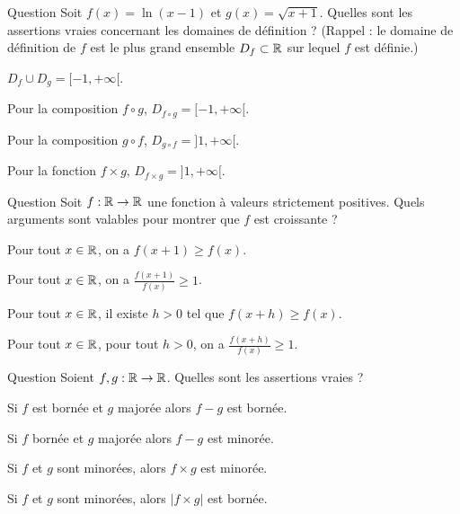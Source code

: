 \begin{multi}[multiple,feedback=
{\(D_f = ]1,+\infty[\) ; \(D_g = [-1,+\infty[\) ; 
\(D_f \cup D_g = [-1,+\infty[\) ;
\(D_{f \times g} = D_f \cap D_g = ]1,+\infty[\) ;
\(D_{f \circ g} = ]1,+\infty[\).
\(g \circ f\) n'est pas définie pour \(x\) proche de \(1\), en fait 
\(D_{g\circ f} = [1+\frac1e,+\infty[\).
}]{Question}
Soit \(f(x) = \ln(x-1)\) et \(g(x) = \sqrt{x+1}\). 
Quelles sont les assertions vraies concernant les domaines de définition ? (Rappel : le domaine de définition de \(f\) est le plus grand ensemble \(D_f \subset \mathbb{R}\) sur lequel \(f\) est définie.)

    \item* \(D_f \cup D_g = [-1,+\infty[\).
    \item Pour la composition \(f \circ g\), \(D_{f\circ g} = [-1,+\infty[\).
    \item Pour la composition \(g \circ f\), \(D_{g\circ f} = ]1,+\infty[\).
    \item* Pour la fonction \(f \times g\), \(D_{f\times g} = ]1,+\infty[\).
\end{multi}


\begin{multi}[multiple,feedback=
{En notant \(y = x+h\) avec \(h>0\) on a \(y > x\) et donc il suffit d'avoir \(\frac{f(y)}{f(x)} \ge 1\).
Par contre, il n'est pas suffisant de comparer \(f\) en des valeurs distantes de \(1\) ! Essayez de dessiner un contre-exemple : \(f\) vaut \(0\) partout, sauf \(1\) en chaque entier.
}]{Question}
Soit \(f : \mathbb{R} \to \mathbb{R}\) une fonction à valeurs strictement positives. Quels arguments sont valables pour montrer que \(f\) est croissante ?

    \item Pour tout \(x\in\mathbb{R}\), on a \(f(x+1) \ge f(x)\).
    \item Pour tout \(x\in\mathbb{R}\), on a \(\frac{f(x+1)}{f(x)} \ge 1\).
    \item Pour tout \(x\in\mathbb{R}\), il existe \(h>0\) tel que \(f(x+h) \ge f(x)\).
    \item* Pour tout \(x\in\mathbb{R}\), pour tout \(h>0\), on a \(\frac{f(x+h)}{f(x)} \ge 1\).
\end{multi}


\begin{multi}[multiple,feedback=
{La somme de deux fonctions majorées (resp. minorées) est majorée (resp. minorée). Ce n'est pas le cas pour le produit : par exemple
\(f(x) = -1\) est minorée, \(g(x) = \exp(x)\) aussi, mais \(f \times g (x) = -\exp(x)\) ne l'est pas.
}]{Question}
Soient \(f,g : \mathbb{R} \to \mathbb{R}\). Quelles sont les assertions vraies ?

    \item Si \(f\) est bornée et \(g\) majorée alors \(f-g\) est bornée.
    \item* Si \(f\) bornée et \(g\) majorée alors \(f-g\) est minorée.
    \item Si \(f\) et \(g\) sont minorées, alors \(f \times g\) est minorée.
    \item Si \(f\) et \(g\) sont minorées, alors \(|f \times g|\) est bornée.
\end{multi}


